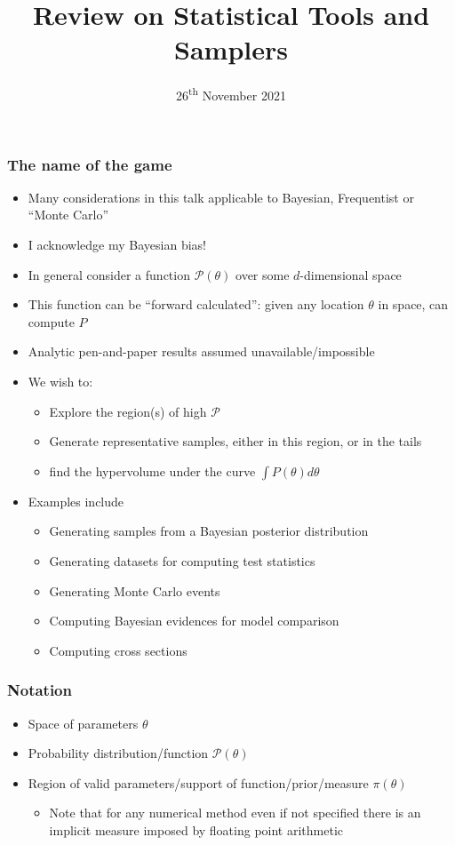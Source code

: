 \documentclass[aspectratio=169]{beamer}
\title{Review on Statistical Tools and Samplers}
\date{26\textsuperscript{th} November 2021}
\begin{document}
\begin{frame}
    \titlepage
\end{frame}

\begin{frame}
    \frametitle{The name of the game}
    \begin{itemize}
        \item Many considerations in this talk applicable to Bayesian, Frequentist or ``Monte Carlo'' 
        \item I acknowledge my Bayesian bias!
        \item In general consider a function $\mathcal{P}(\theta)$ over some $d$-dimensional space
        \item This function can be ``forward calculated'': given any location $\theta$ in space, can compute $P$
        \item Analytic pen-and-paper results assumed unavailable/impossible
        \item We wish to:
            \begin{itemize}
                \item Explore the region(s) of high $\mathcal{P}$
                \item Generate representative samples, either in this region, or in the tails
                \item find the hypervolume under the curve $\int P(\theta) d\theta$
            \end{itemize}
        \item Examples include
            \begin{itemize}
                \item Generating samples from a Bayesian posterior distribution
                \item Generating datasets for computing test statistics
                \item Generating Monte Carlo events 
                \item Computing Bayesian evidences for model comparison
                \item Computing cross sections
            \end{itemize}
    \end{itemize}
\end{frame}

\begin{frame}
    \frametitle{Notation}
    \begin{itemize}
        \item Space of parameters $\theta$
        \item Probability distribution/function $\mathcal{P}(\theta)$
        \item Region of valid parameters/support of function/prior/measure $\pi(\theta)$
            \begin{itemize}
                \item Note that for any numerical method even if not specified there is an implicit measure imposed by floating point arithmetic
            \end{itemize}
    \end{itemize}
\end{frame}
\end{document}
